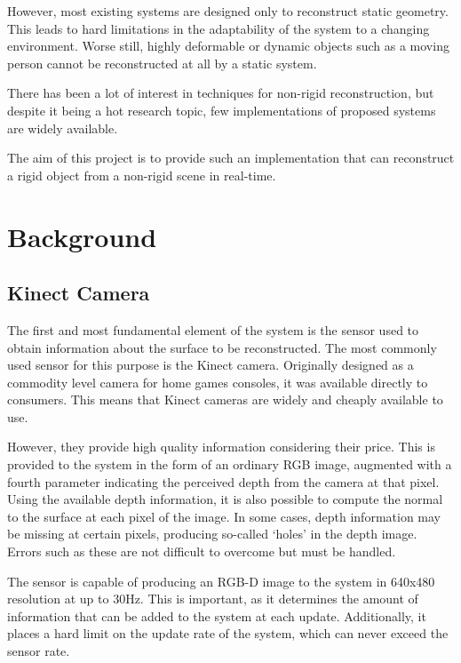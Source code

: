 \documentclass[12pt,twoside]{report}
\begin{document}
However, most existing systems are designed only to reconstruct static geometry. This leads to hard limitations in the adaptability of the system to a changing environment. Worse still, highly deformable or dynamic objects such as a moving person cannot be reconstructed at all by a static system.

There has been a lot of interest in techniques for non-rigid reconstruction, but despite it being a hot research topic, few implementations of proposed systems are widely available.

The aim of this project is to provide such an implementation that can reconstruct a rigid object from a  non-rigid scene in real-time.


\chapter{Background}

\section{Kinect Camera}

The first and most fundamental element of the system is the sensor used to obtain information about the surface to be reconstructed. The most commonly used sensor for this purpose is the Kinect camera. Originally designed as a commodity level camera for home games consoles, it was available directly to consumers. This means that Kinect cameras are widely and cheaply available to use.

However, they provide high quality information considering their price. This is provided to the system in the form of an ordinary RGB image, augmented with a fourth parameter indicating the perceived depth from the camera at that pixel. Using the available depth information, it is also possible to compute the normal to the surface at each pixel of the image. In some cases, depth information may be missing at certain pixels, producing so-called `holes' in the depth image. Errors such as these are not difficult to overcome but must be handled.


The sensor is capable of producing an RGB-D image to the system in 640x480 resolution at up to 30Hz. This is important, as it determines the amount of information that can be added to the system at each update. Additionally, it places a hard limit on the update rate of the system, which can never exceed the sensor rate.
\end{document}
